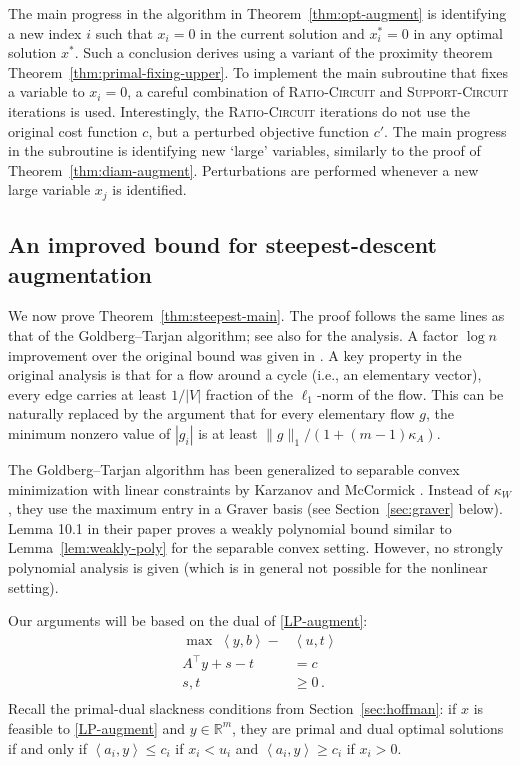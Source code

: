\documentclass[11pt, a4paper]{article}
\newcommand{\Le}{\kappa}
\newcommand{\pr}[2]{\left\langle #1, #2 \right\rangle}
\newcommand{\1}{\mathbbm{1}}
\theoremstyle{case}
\newcommand{\R}{\mathbb{R}}
\begin{document}
\medskip
The main progress in the algorithm in Theorem~\ref{thm:opt-augment} is identifying a new index $i$  such that  $x_i=0$ in the current solution and $x_i^* = 0$ in any optimal solution $x^*$. Such a conclusion derives using a variant of the proximity theorem Theorem~\ref{thm:primal-fixing-upper}.
To implement the main subroutine that fixes a variable to $x_i=0$, a careful combination of \textsc{Ratio-Circuit}  and \textsc{Support-Circuit}  iterations is used.
Interestingly, the \textsc{Ratio-Circuit} iterations do not use the original cost function $c$, but a perturbed objective function $c'$. The main progress in the subroutine is identifying new `large' variables, similarly to the proof of Theorem~\ref{thm:diam-augment}. Perturbations are performed whenever a new large variable $x_j$ is identified.

\subsection{An improved bound for steepest-descent augmentation}
\label{sec:steepest-improved}
We now prove Theorem~\ref{thm:steepest-main}.
The proof follows the same lines as that of the Goldberg--Tarjan algorithm; see also \cite[Section 10.5]{amo} for the analysis. A factor $\log n$ improvement over the original bound was given in \cite{Radzik-Goldberg}. A key property in the original analysis is that for a flow around a cycle (i.e., an elementary vector), every edge carries at least $1/|V|$ fraction of the $\ell_1$-norm of the flow. This can be naturally replaced by the argument that for every elementary flow $g$, the minimum nonzero value of $|g_i|$ is at least $\|g\|_1/(1+(m-1)\kappa_A)$. 

The Goldberg--Tarjan algorithm has been generalized to separable convex minimization with linear constraints by Karzanov and McCormick \cite{Karzanov97}. Instead of $\Le_W$, they use the maximum entry in a Graver basis (see Section~\ref{sec:graver} below). Lemma 10.1 in their paper proves a weakly polynomial bound similar to Lemma~\ref{lem:weakly-poly} for the separable convex setting. However, no strongly polynomial analysis is given (which is in general not possible for the nonlinear setting).

\medskip

Our arguments will be based on the dual of \ref{LP-augment}:
\begin{equation}
\label{LP-augment-dual}
  \begin{aligned}
  \max \;  \pr{y}{b}-&\pr{u}{t} \\
  A^\top y + s-t &= c \\
  s,t & \geq 0\,. \\
  \end{aligned}
\end{equation}
Recall the primal-dual slackness conditions from Section~\ref{sec:hoffman}: if  $x$ is feasible to \ref{LP-augment} and $y\in\R^m$, they  are primal and dual optimal solutions if and only if $\pr{a_i}{y}\le c_i$ if $x_i<u_i$ and $\pr{a_i}{y}\ge c_i$ if $x_i>0$.
\end{document}
